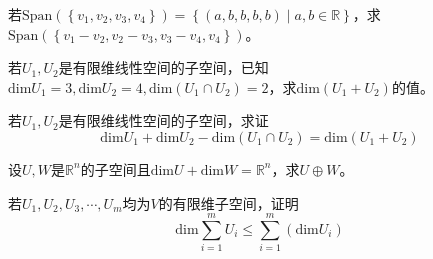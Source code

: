 \begin{reidai}
	若$\text{Span}(\left\{ v_1,v_2,v_3,v_4 \right\})=\left\{ (a,b,b,b,b)\mid a,b \in \mathbb{R} \right\}$，求$\text{Span}(\left\{ v_1-v_2,v_2-v_3,v_3-v_4,v_4 \right\})$。
\end{reidai}

\begin{reidai}
	若$U_1,U_2$是有限维线性空间的子空间，已知$\text{dim}U_1=3,\text{dim}U_2=4,\text{dim}(U_1 \cap U_2)=2$，求$\text{dim}(U_1+U_2)$的值。
\end{reidai}

\begin{reidai}
	若$U_1,U_2$是有限维线性空间的子空间，求证$$\text{dim}U_1+\text{dim}U_2-\text{dim}(U_1 \cap U_2)=\text{dim}(U_1+U_2)$$
\end{reidai}

\begin{reidai}
	设$U,W$是$\mathbb{R}^n$的子空间且$\text{dim}U+\text{dim}W=\mathbb{R}^n$，求$U \oplus W$。
\end{reidai}

\begin{reidai}
	若$U_1,U_2,U_3,\cdots,U_m$均为$V$的有限维子空间，证明$$\text{dim} \sum_{i=1}^{m}U_i\le \sum_{i=1}^{m} \left ( \text{dim} U_i \right ) $$
\end{reidai}

